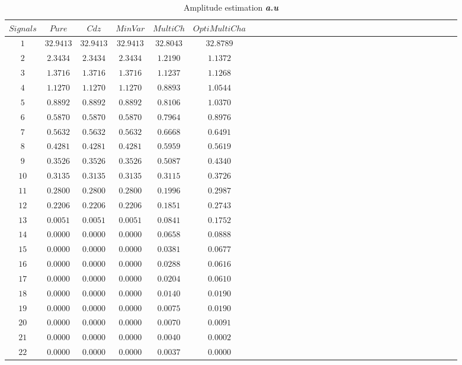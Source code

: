  \begin{table}[!htbp]
\centering
\caption{Amplitude estimation \textbf{\textit{a.u}}}
\label{table:5}
\begin{tabular}{c c c c c c c c c c c c c c c c c c c c c c c c c c c c c c c } 
   \hline 
$Signals$&$Pure$&$Cdz$&$MinVar$&$MultiCh$&$OptiMultiCha$\\
   \hline 
$1$&$32.9413$&$32.9413$&$32.9413$&$32.8043$&$32.8789$\\
$2$&$ 2.3434$&$ 2.3434$&$ 2.3434$&$ 1.2190$&$ 1.1372$\\
$3$&$ 1.3716$&$ 1.3716$&$ 1.3716$&$ 1.1237$&$ 1.1268$\\
$4$&$ 1.1270$&$ 1.1270$&$ 1.1270$&$ 0.8893$&$ 1.0544$\\
$5$&$ 0.8892$&$ 0.8892$&$ 0.8892$&$ 0.8106$&$ 1.0370$\\
$6$&$ 0.5870$&$ 0.5870$&$ 0.5870$&$ 0.7964$&$ 0.8976$\\
$7$&$ 0.5632$&$ 0.5632$&$ 0.5632$&$ 0.6668$&$ 0.6491$\\
$8$&$ 0.4281$&$ 0.4281$&$ 0.4281$&$ 0.5959$&$ 0.5619$\\
$9$&$ 0.3526$&$ 0.3526$&$ 0.3526$&$ 0.5087$&$ 0.4340$\\
$10$&$ 0.3135$&$ 0.3135$&$ 0.3135$&$ 0.3115$&$ 0.3726$\\
$11$&$ 0.2800$&$ 0.2800$&$ 0.2800$&$ 0.1996$&$ 0.2987$\\
$12$&$ 0.2206$&$ 0.2206$&$ 0.2206$&$ 0.1851$&$ 0.2743$\\
$13$&$ 0.0051$&$ 0.0051$&$ 0.0051$&$ 0.0841$&$ 0.1752$\\
$14$&$ 0.0000$&$ 0.0000$&$ 0.0000$&$ 0.0658$&$ 0.0888$\\
$15$&$ 0.0000$&$ 0.0000$&$ 0.0000$&$ 0.0381$&$ 0.0677$\\
$16$&$ 0.0000$&$ 0.0000$&$ 0.0000$&$ 0.0288$&$ 0.0616$\\
$17$&$ 0.0000$&$ 0.0000$&$ 0.0000$&$ 0.0204$&$ 0.0610$\\
$18$&$ 0.0000$&$ 0.0000$&$ 0.0000$&$ 0.0140$&$ 0.0190$\\
$19$&$ 0.0000$&$ 0.0000$&$ 0.0000$&$ 0.0075$&$ 0.0190$\\
$20$&$ 0.0000$&$ 0.0000$&$ 0.0000$&$ 0.0070$&$ 0.0091$\\
$21$&$ 0.0000$&$ 0.0000$&$ 0.0000$&$ 0.0040$&$ 0.0002$\\
$22$&$ 0.0000$&$ 0.0000$&$ 0.0000$&$ 0.0037$&$ 0.0000$\\
     \hline 

\end{tabular}
\end{table}

